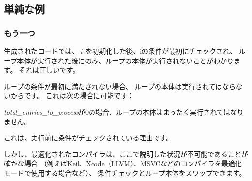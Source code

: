 ﻿\subsection{単純な例}





\subsubsection{もう一つ}

生成されたコードでは、 
$i$ を初期化した後、iの条件が最初にチェックされ、
ループ本体が実行された後にのみ、ループの本体が実行されないことがわかります。 
それは正しいです。

ループの条件が最初に満たされない場合、
ループの本体は実行されてはならないからです。
これは次の場合に可能です：



\emph{total\_entries\_to\_process}が0の場合、ループの本体はまったく実行されてはなりません。

これは、実行前に条件がチェックされている理由です。

しかし、最適化されたコンパイラは、ここで説明した状況が不可能であることが確かな場合
（例えばKeil、Xcode（LLVM）、MSVCなどのコンパイラを最適化モードで使用する場合など）、
条件チェックとループ本体をスワップできます。
